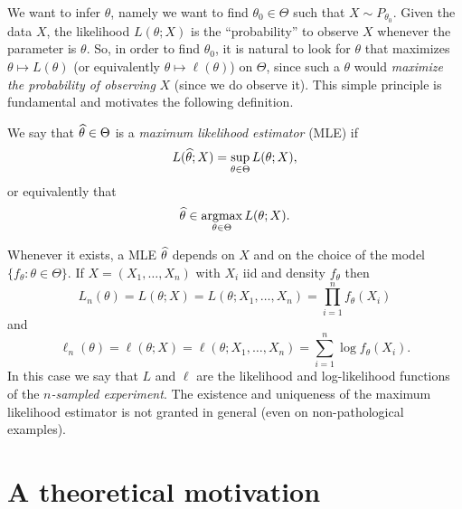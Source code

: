 We want to infer $\theta$, namely we want to find $\theta_0 \in \Theta$ such that $X \sim P_{\theta_0}$.
Given the data $X$, the likelihood $L(\theta; X)$ is the ``probability'' to observe $X$ whenever the parameter is $\theta$. 
So, in order to find $\theta_0$, it is natural to look for $\theta$ that maximizes $\theta \mapsto L(\theta)$ (or equivalently $\theta \mapsto \ell(\theta)$) on $\Theta$, since such a $\theta$ would \emph{maximize the probability of observing} $X$ (since we do observe it).
This simple principle is fundamental and motivates the following definition.
\begin{definition}
	We say that $\widehat \theta \in \Theta$ is a \emph{maximum likelihood estimator} (MLE) if
	\begin{equation*}
		L(\widehat \theta; X) = \sup_{\theta \in \Theta} L(\theta; X),
	\end{equation*}
	or equivalently that
	\begin{equation*}
		\widehat \theta \in \operatorname*{argmax}_{\theta \in \Theta} L(\theta; X).
	\end{equation*}
\end{definition}
Whenever it exists, a MLE $\widehat \theta$ depends on $X$ and on the choice of the model $\{ f_\theta : \theta \in \Theta \}$.
If $X = (X_1, \ldots, X_n)$ with $X_i$ iid and density $f_\theta$ then
\begin{equation*}
	L_n(\theta) = L(\theta; X) = L(\theta; X_1, \ldots, X_n) = \prod_{i=1}^n f_\theta(X_i)
\end{equation*}
and
\begin{equation*}
	\ell_n(\theta) = \ell(\theta; X) = \ell(\theta; X_1, \ldots, X_n) = \sum_{i=1}^n \log f_\theta(X_i).
\end{equation*}
In this case we say that $L$ and $\ell$ are the likelihood and log-likelihood functions of the \emph{$n$-sampled experiment}.
The existence and uniqueness of the maximum likelihood estimator is not granted in general (even on non-pathological examples).%

\section{A theoretical motivation} %
\label{sec:a_theoretical_motivation}

